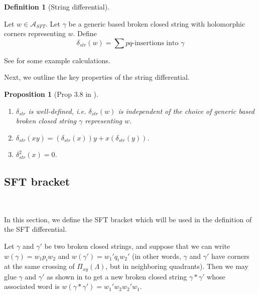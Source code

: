 \documentclass[a4paper,final, reqno]{amsart}
\theoremstyle{plain}
\newtheorem{Prop}[Th]{Proposition}
\theoremstyle{definition}
\newtheorem{Def}[Th]{Definition}
\newcommand{\A}{\mathcal{A}}
\begin{document}
	\begin{Def}[String differential]
		
		\-\
		
		Let $w\in \A_{SFT}$. Let $\gamma$ be a generic based broken closed string with holomorphic corners representing $w$. Define 
		\[ \delta_{str}(w) = \sum pq \text{-insertions into } \gamma \]
	\end{Def}
	
	See  for some example calculations.
	
	Next, we outline the key properties of the string differential. 
	
	
	
	
	
	\begin{Prop}[Prop 3.8 in \cite{ng}]
		
		\-\
		
		\begin{enumerate}
			\item $\delta_{str}$ is well-defined, i.e. $\delta_{str}(w)$ is independent of the choice of generic based broken closed string $\gamma$ representing $w$.
			\item $\delta_{str}(xy) = (\delta_{str} (x))y + x(\delta_{str} (y))$.
			\item $\delta_{str}^2(x) = 0$.
		\end{enumerate}
	\end{Prop}
	
	
	
	\subsection{SFT bracket}
	
	\-\
	
	In this section, we define the SFT bracket which will be used in the definition of the SFT differential.
	
	
	
	Let $\gamma$ and $\gamma'$ be two broken closed strings, and suppose that we can write $w(\gamma) = w_1 p_i w_2$ and $w(\gamma') = w_1' q_i w_2'$ (in other words, $\gamma$ and $\gamma'$ have corners at the same crossing of $\Pi_{xy}(\Lambda)$, but in neighboring quadrants). Then we may glue $\gamma$ and $\gamma'$ as shown in  to get a new broken closed string $\gamma * \gamma'$ whose associated word is $w(\gamma*\gamma') = w_1'w_2 w_2' w_1$. 
	
\end{document}
